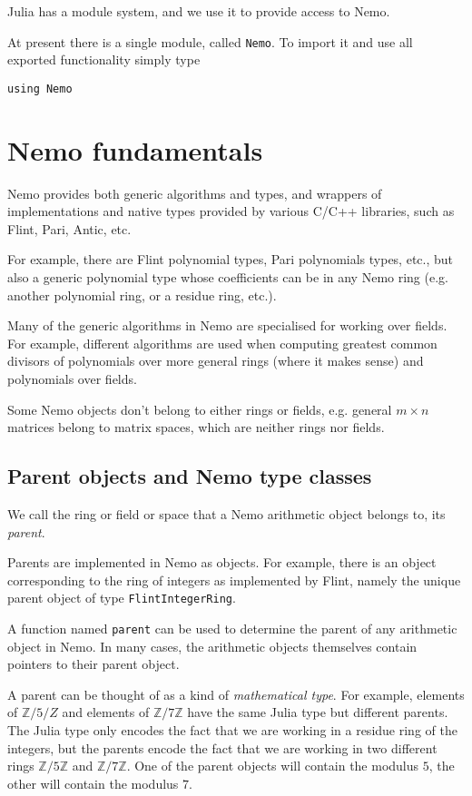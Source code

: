 \documentclass[a4paper,10pt]{article}
\newcommand{\Z}{\mathbb{Z}}
\newcommand{\code}{\lstinline}
\begin{document}
Julia has a module system, and we use it to provide access to Nemo.

At present there is a single module, called \code{Nemo}. To import it and use all
exported functionality simply type

\begin{lstlisting}
using Nemo
\end{lstlisting}

\section{Nemo fundamentals}

Nemo provides both generic algorithms and types, and wrappers of implementations and native types
provided by various C/C++ libraries, such as Flint, Pari, Antic, etc.

For example, there are Flint polynomial types, Pari polynomials types, etc., but also a generic
polynomial type whose coefficients can be in any Nemo ring (e.g. another polynomial ring, or a residue
ring, etc.).

Many of the generic algorithms in Nemo are specialised for working over fields. For example, different
algorithms are used when computing greatest common divisors of polynomials over more general rings 
(where it makes sense) and polynomials over fields.
 
Some Nemo objects don't belong to either rings or fields, e.g. general $m\times n$ matrices belong to
matrix spaces, which are neither rings nor fields.

\subsection{Parent objects and Nemo type classes}

We call the ring or field or space that a Nemo arithmetic object belongs to, its \emph{parent}.

Parents are implemented in Nemo as objects. For example, there is an object corresponding to the ring
of integers as implemented by Flint, namely the unique parent object of type \code{FlintIntegerRing}.

A function named \code{parent} can be used to determine the parent of any arithmetic object in Nemo. In
many cases, the arithmetic objects themselves contain pointers to their parent object.

A parent can be thought of as a kind of \emph{mathematical type}. For example, elements of $\Z/5/Z$ and
elements of $\Z/7\Z$ have the same Julia type but different parents. The Julia type only encodes the
fact that we are working in a residue ring of the integers, but the parents encode the fact that we are
working in two different rings $\Z/5\Z$ and $\Z/7\Z$. One of the parent objects will contain the modulus
$5$, the other will contain the modulus $7$.
\end{document}
